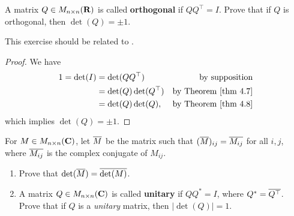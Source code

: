 \begin{exercise} \label{exercise 4.3.12}
A matrix \(Q \in M_{n \times n}(\mathbf{R})\) is called \textbf{orthogonal} if \(QQ^\top = I\).
Prove that if \(Q\) is orthogonal, then \(\det(Q) = \pm 1\).
\end{exercise}

\begin{note}
This exercise should be related to .
\end{note}

\begin{proof}
We have
\begin{align*}
    1 = \det(I) & = \det(QQ^\top) & \text{by supposition} \\
                & = \det(Q) \det(Q^\top) & \text{by \THM{4.7}} \\
                & = \det(Q) \det(Q), & \text{by \THM{4.8}} \\
\end{align*}
which implies \(\det(Q) = \pm 1\).
\end{proof}

\begin{exercise} \label{exercise 4.3.13}
For \(M \in M_{n \times n}(\mathbf{C})\), let \(\overline{M}\) be the matrix such that \((\overline{M})_{ij} = \overline{M_{ij}}\) for all \(i, j\),
where \(\overline{M_{ij}}\) is the complex conjugate of \(M_{ij}\).
\begin{enumerate}
\item Prove that \(\det(\overline{M}) = \overline{\det(M)}\).

\item A matrix \(Q \in M_{n \times n}(\mathbf{C})\) is called \textbf{unitary} if \(QQ^* = I\), where \(Q^* = \overline{Q^\top}\).
Prove that if \(Q\) is a \emph{unitary} matrix, then \(\left| \det(Q) \right| = 1\).
\end{enumerate}
\end{exercise}


